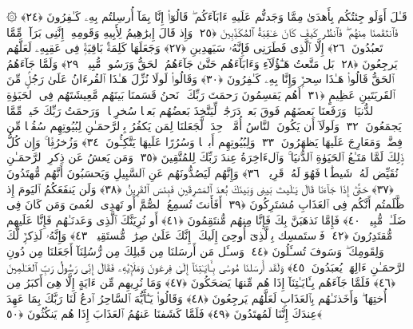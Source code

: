  ۞ قَـٰلَ أَوَلَو جِئتُكُم بِأَهدَىٰ مِمَّا وَجَدتُّم عَلَيهِ ءَابَآءَكُم ۖ قَالُوٓا۟ إِنَّا بِمَآ أُرسِلتُم بِهِۦ كَـٰفِرُونَ ﴿٢٤﴾
 فَٱنتَقَمنَا مِنهُم ۖ فَٱنظُر كَيفَ كَانَ عَـٰقِبَةُ ٱلمُكَذِّبِينَ ﴿٢٥﴾
 وَإِذ قَالَ إِبرَٰهِيمُ لِأَبِيهِ وَقَومِهِۦٓ إِنَّنِى بَرَآءٌۭ مِّمَّا تَعبُدُونَ ﴿٢٦﴾
 إِلَّا ٱلَّذِى فَطَرَنِى فَإِنَّهُۥ سَيَهدِينِ ﴿٢٧﴾
 وَجَعَلَهَا كَلِمَةًۢ بَاقِيَةًۭ فِى عَقِبِهِۦ لَعَلَّهُم يَرجِعُونَ ﴿٢٨﴾
 بَل مَتَّعتُ هَـٰٓؤُلَآءِ وَءَابَآءَهُم حَتَّىٰ جَآءَهُمُ ٱلحَقُّ وَرَسُولٌۭ مُّبِينٌۭ ﴿٢٩﴾
 وَلَمَّا جَآءَهُمُ ٱلحَقُّ قَالُوا۟ هَـٰذَا سِحرٌۭ وَإِنَّا بِهِۦ كَـٰفِرُونَ ﴿٣٠﴾
 وَقَالُوا۟ لَولَا نُزِّلَ هَـٰذَا ٱلقُرءَانُ عَلَىٰ رَجُلٍۢ مِّنَ ٱلقَريَتَينِ عَظِيمٍ ﴿٣١﴾
 أَهُم يَقسِمُونَ رَحمَتَ رَبِّكَ ۚ نَحنُ قَسَمنَا بَينَهُم مَّعِيشَتَهُم فِى ٱلحَيَوٰةِ ٱلدُّنيَا ۚ وَرَفَعنَا بَعضَهُم فَوقَ بَعضٍۢ دَرَجَٰتٍۢ لِّيَتَّخِذَ بَعضُهُم بَعضًۭا سُخرِيًّۭا ۗ وَرَحمَتُ رَبِّكَ خَيرٌۭ مِّمَّا يَجمَعُونَ ﴿٣٢﴾
 وَلَولَآ أَن يَكُونَ ٱلنَّاسُ أُمَّةًۭ وَٟحِدَةًۭ لَّجَعَلنَا لِمَن يَكفُرُ بِٱلرَّحمَـٰنِ لِبُيُوتِهِم سُقُفًۭا مِّن فِضَّةٍۢ وَمَعَارِجَ عَلَيهَا يَظهَرُونَ ﴿٣٣﴾
 وَلِبُيُوتِهِم أَبوَٟبًۭا وَسُرُرًا عَلَيهَا يَتَّكِـُٔونَ ﴿٣٤﴾
 وَزُخرُفًۭا ۚ وَإِن كُلُّ ذَٟلِكَ لَمَّا مَتَـٰعُ ٱلحَيَوٰةِ ٱلدُّنيَا ۚ وَٱلءَاخِرَةُ عِندَ رَبِّكَ لِلمُتَّقِينَ ﴿٣٥﴾
 وَمَن يَعشُ عَن ذِكرِ ٱلرَّحمَـٰنِ نُقَيِّض لَهُۥ شَيطَٰنًۭا فَهُوَ لَهُۥ قَرِينٌۭ ﴿٣٦﴾
 وَإِنَّهُم لَيَصُدُّونَهُم عَنِ ٱلسَّبِيلِ وَيَحسَبُونَ أَنَّهُم مُّهتَدُونَ ﴿٣٧﴾
 حَتَّىٰٓ إِذَا جَآءَنَا قَالَ يَـٰلَيتَ بَينِى وَبَينَكَ بُعدَ ٱلمَشرِقَينِ فَبِئسَ ٱلقَرِينُ ﴿٣٨﴾
 وَلَن يَنفَعَكُمُ ٱليَومَ إِذ ظَّلَمتُم أَنَّكُم فِى ٱلعَذَابِ مُشتَرِكُونَ ﴿٣٩﴾
 أَفَأَنتَ تُسمِعُ ٱلصُّمَّ أَو تَهدِى ٱلعُمىَ وَمَن كَانَ فِى ضَلَـٰلٍۢ مُّبِينٍۢ ﴿٤٠﴾
 فَإِمَّا نَذهَبَنَّ بِكَ فَإِنَّا مِنهُم مُّنتَقِمُونَ ﴿٤١﴾
 أَو نُرِيَنَّكَ ٱلَّذِى وَعَدنَـٰهُم فَإِنَّا عَلَيهِم مُّقتَدِرُونَ ﴿٤٢﴾
 فَٱستَمسِك بِٱلَّذِىٓ أُوحِىَ إِلَيكَ ۖ إِنَّكَ عَلَىٰ صِرَٰطٍۢ مُّستَقِيمٍۢ ﴿٤٣﴾
 وَإِنَّهُۥ لَذِكرٌۭ لَّكَ وَلِقَومِكَ ۖ وَسَوفَ تُسـَٔلُونَ ﴿٤٤﴾
 وَسـَٔل مَن أَرسَلنَا مِن قَبلِكَ مِن رُّسُلِنَآ أَجَعَلنَا مِن دُونِ ٱلرَّحمَـٰنِ ءَالِهَةًۭ يُعبَدُونَ ﴿٤٥﴾
 وَلَقَد أَرسَلنَا مُوسَىٰ بِـَٔايَـٰتِنَآ إِلَىٰ فِرعَونَ وَمَلَإِي۟هِۦ فَقَالَ إِنِّى رَسُولُ رَبِّ ٱلعَـٰلَمِينَ ﴿٤٦﴾
 فَلَمَّا جَآءَهُم بِـَٔايَـٰتِنَآ إِذَا هُم مِّنهَا يَضحَكُونَ ﴿٤٧﴾
 وَمَا نُرِيهِم مِّن ءَايَةٍ إِلَّا هِىَ أَكبَرُ مِن أُختِهَا ۖ وَأَخَذنَـٰهُم بِٱلعَذَابِ لَعَلَّهُم يَرجِعُونَ ﴿٤٨﴾
 وَقَالُوا۟ يَـٰٓأَيُّهَ ٱلسَّاحِرُ ٱدعُ لَنَا رَبَّكَ بِمَا عَهِدَ عِندَكَ إِنَّنَا لَمُهتَدُونَ ﴿٤٩﴾
 فَلَمَّا كَشَفنَا عَنهُمُ ٱلعَذَابَ إِذَا هُم يَنكُثُونَ ﴿٥٠﴾
